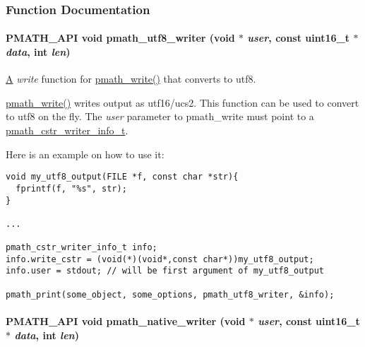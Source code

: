 \subsubsection{Function Documentation}
\hypertarget{group__strings_g5e7a9b1a5eb8861e94dc1bea92c77424}{
\paragraph[{pmath\_\-utf8\_\-writer}]{\setlength{\rightskip}{0pt plus 5cm}PMATH\_\-API void pmath\_\-utf8\_\-writer (void $\ast$ {\em user}, \/  const uint16\_\-t $\ast$ {\em data}, \/  int {\em len})}\hfill}
\label{group__strings_g5e7a9b1a5eb8861e94dc1bea92c77424}


\hyperlink{class_a}{A} {\em write\/} function for \hyperlink{group__objects_g9f909b9eb04317260ee8630d10e5a7c6}{pmath\_\-write()} that converts to utf8. 

\hyperlink{group__objects_g9f909b9eb04317260ee8630d10e5a7c6}{pmath\_\-write()} writes output as utf16/ucs2. This function can be used to convert to utf8 on the fly. The {\em user\/} parameter to pmath\_\-write must point to a \hyperlink{structpmath__cstr__writer__info__t}{pmath\_\-cstr\_\-writer\_\-info\_\-t}.

Here is an example on how to use it: 

\begin{Code}\begin{verbatim}void my_utf8_output(FILE *f, const char *str){
  fprintf(f, "%s", str);
}

...

pmath_cstr_writer_info_t info;
info.write_cstr = (void(*)(void*,const char*))my_utf8_output;
info.user = stdout; // will be first argument of my_utf8_output

pmath_print(some_object, some_options, pmath_utf8_writer, &info);
\end{verbatim}
\end{Code}

 \hypertarget{group__strings_ga3ecac6a71274a3e43cedadb10085f2b}{
\paragraph[{pmath\_\-native\_\-writer}]{\setlength{\rightskip}{0pt plus 5cm}PMATH\_\-API void pmath\_\-native\_\-writer (void $\ast$ {\em user}, \/  const uint16\_\-t $\ast$ {\em data}, \/  int {\em len})}\hfill}
\label{group__strings_ga3ecac6a71274a3e43cedadb10085f2b}


